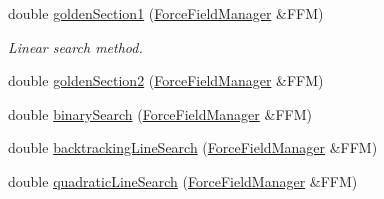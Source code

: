 {\bf }\par
\begin{DoxyCompactItemize}
\item 
double \hyperlink{classCGMethod_ace5a720fe0f5d6ffcefeb9f4afcfe28f}{golden\+Section1} (\hyperlink{classForceFieldManager}{Force\+Field\+Manager} \&F\+F\+M)
\begin{DoxyCompactList}\small\item\em Linear search method. \end{DoxyCompactList}\item 
double \hyperlink{classCGMethod_aa1fcbcd087af6fa3aa9aab67b0b60103}{golden\+Section2} (\hyperlink{classForceFieldManager}{Force\+Field\+Manager} \&F\+F\+M)
\item 
double \hyperlink{classCGMethod_a2d9a41ddbf7d54e6f89ee02966c7d85c}{binary\+Search} (\hyperlink{classForceFieldManager}{Force\+Field\+Manager} \&F\+F\+M)
\item 
double \hyperlink{classCGMethod_a432019c8a52f50b0cb8cb39b937db978}{backtracking\+Line\+Search} (\hyperlink{classForceFieldManager}{Force\+Field\+Manager} \&F\+F\+M)
\item 
double \hyperlink{classCGMethod_aa77b006b710d67b248dd18517db7709c}{quadratic\+Line\+Search} (\hyperlink{classForceFieldManager}{Force\+Field\+Manager} \&F\+F\+M)
\end{DoxyCompactItemize}

